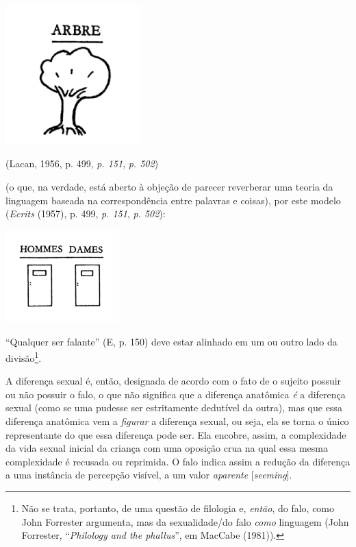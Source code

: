 \begin{center}
\includegraphics[width=2.06597in,height=2.11319in]{./img1.jpg}

(Lacan, 1956, p. 499, \emph{p. 151}, \emph{p. 502})
\end{center}

\noindent{}(o que, na verdade, está aberto à objeção de parecer reverberar uma
teoria da linguagem baseada na correspondência entre palavras e coisas),
por este modelo (\emph{Ecrits} (1957), p. 499, \emph{p. 151}, \emph{p.
502}):

\begin{center}
\includegraphics[width=1.72639in,height=1.40556in]{./img2.jpg}
\end{center}

``Qualquer ser falante'' (E, p. 150) deve estar alinhado em um ou outro
lado da divisão\footnote{Não se trata, portanto, de uma questão de
  filologia e, \emph{então}, do falo, como John Forrester argumenta, mas
  da sexualidade/do falo \emph{como} linguagem (John Forrester,
  ``\emph{Philology and the phallus}'', em MacCabe (1981)).}.

A diferença sexual é, então, designada de acordo com o fato de o sujeito
possuir ou não possuir o falo, o que não significa que a diferença
anatômica \emph{é} a diferença sexual (como se uma pudesse ser
estritamente dedutível da outra), mas que essa diferença anatômica vem a
\emph{figurar} a diferença sexual, ou seja, ela se torna o único
representante do que essa diferença pode ser. Ela encobre, assim, a
complexidade da vida sexual inicial da criança com uma oposição crua na
qual essa mesma complexidade é recusada ou reprimida. O falo indica
assim a redução da diferença a uma instância de percepção visível, a um
valor \emph{aparente} {[}\emph{seeming}{]}.

